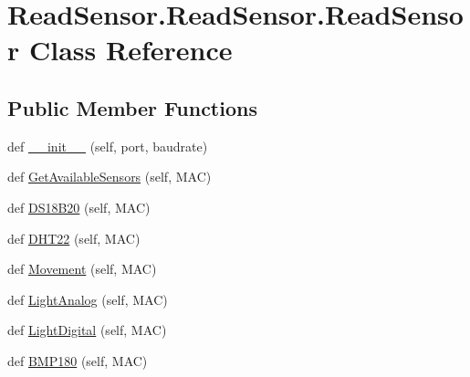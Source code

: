 \hypertarget{classReadSensor_1_1ReadSensor_1_1ReadSensor}{}\section{Read\+Sensor.\+Read\+Sensor.\+Read\+Sensor Class Reference}
\label{classReadSensor_1_1ReadSensor_1_1ReadSensor}
\subsection*{Public Member Functions}
\begin{DoxyCompactItemize}
\item 
def \hyperlink{classReadSensor_1_1ReadSensor_1_1ReadSensor_ac63fc790db03ad3f967f55e822439f3a}{\+\_\+\+\_\+init\+\_\+\+\_\+} (self, port, baudrate)
\item 
def \hyperlink{classReadSensor_1_1ReadSensor_1_1ReadSensor_a1baee16b9594cd5e936d70ba5b2ca766}{Get\+Available\+Sensors} (self, M\+AC)
\item 
def \hyperlink{classReadSensor_1_1ReadSensor_1_1ReadSensor_a4886078ef8141638fa77f74b460cc6a8}{D\+S18\+B20} (self, M\+AC)
\item 
def \hyperlink{classReadSensor_1_1ReadSensor_1_1ReadSensor_a0fce5453956e120cf8b803f4bdf8c8f0}{D\+H\+T22} (self, M\+AC)
\item 
def \hyperlink{classReadSensor_1_1ReadSensor_1_1ReadSensor_a05b0c3d365d87a9918b31ee59e653bc0}{Movement} (self, M\+AC)
\item 
def \hyperlink{classReadSensor_1_1ReadSensor_1_1ReadSensor_a64bc538f36af840747f77ad04dcfb2b6}{Light\+Analog} (self, M\+AC)
\item 
def \hyperlink{classReadSensor_1_1ReadSensor_1_1ReadSensor_adf67c50f274add6505dee49690f1de93}{Light\+Digital} (self, M\+AC)
\item 
def \hyperlink{classReadSensor_1_1ReadSensor_1_1ReadSensor_abfe83fdebe959943228e1d7588d12c18}{B\+M\+P180} (self, M\+AC)
\end{DoxyCompactItemize}
